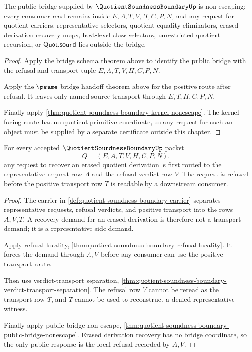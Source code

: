 \begin{theorem}
\label{thm:quotient-soundness-boundary-public-bridge-nonescape}
The public bridge supplied by $\QuotientSoundnessBoundaryUp$ is non-escaping: every consumer read remains inside $E,A,T,V,H,C,P,N$, and any request for quotient carriers, representative selectors, quotient equality eliminators, erased derivation recovery maps, host-level class selectors, unrestricted quotient recursion, or $\mathsf{Quot.sound}$ lies outside the bridge.
\end{theorem}
\begin{proof}
Apply the bridge schema theorem above to identify the public bridge with the refusal-and-transport tuple $E,A,T,V,H,C,P,N$.

Apply the $\psame$ bridge handoff theorem above for the positive route after refusal. It leaves only named-source transport through $E,T,H,C,P,N$.

Finally apply \autoref{thm:quotient-soundness-boundary-kernel-nonescape}. The kernel-facing route has no quotient primitive coordinate, so any request for such an object must be supplied by a separate certificate outside this chapter.
\end{proof}

\begin{theorem}
\label{thm:quotient-soundness-boundary-erased-derivation-refusal}
For every accepted $\QuotientSoundnessBoundaryUp$ packet
$$
Q=(E,A,T,V,H,C,P,N),
$$
any request to recover an erased quotient derivation is first routed to the representative-request row $A$ and the refusal-verdict row $V$. The request is refused before the positive transport row $T$ is readable by a downstream consumer.
\end{theorem}
\begin{proof}
The carrier in \autoref{def:quotient-soundness-boundary-carrier} separates representative requests, refusal verdicts, and positive transport into the rows $A,V,T$. A recovery demand for an erased derivation is therefore not a transport demand; it is a representative-side demand.

Apply refusal locality, \autoref{thm:quotient-soundness-boundary-refusal-locality}. It forces the demand through $A,V$ before any consumer can use the positive transport route.

Then use verdict-transport separation, \autoref{thm:quotient-soundness-boundary-verdict-transport-separation}. The refusal row $V$ cannot be reread as the transport row $T$, and $T$ cannot be used to reconstruct a denied representative witness.

Finally apply public bridge non-escape, \autoref{thm:quotient-soundness-boundary-public-bridge-nonescape}. Erased derivation recovery has no bridge coordinate, so the only public response is the local refusal recorded by $A,V$.
\end{proof}

